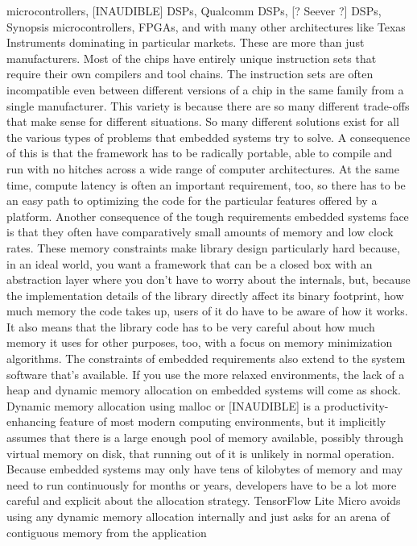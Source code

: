 microcontrollers, [INAUDIBLE] DSPs, Qualcomm DSPs, [? Seever ?] DSPs,
Synopsis microcontrollers, FPGAs, and with many other architectures
like Texas Instruments dominating in particular markets.
These are more than just manufacturers.
Most of the chips have entirely unique instruction sets
that require their own compilers and tool chains.
The instruction sets are often incompatible
even between different versions of a chip in the same family
from a single manufacturer.
This variety is because there are so many different trade-offs that
make sense for different situations.
So many different solutions exist for all the various types of problems
that embedded systems try to solve.
A consequence of this is that the framework
has to be radically portable, able to compile and run with no hitches
across a wide range of computer architectures.
At the same time, compute latency is often an important requirement, too,
so there has to be an easy path to optimizing
the code for the particular features offered by a platform.
Another consequence of the tough requirements embedded systems face
is that they often have comparatively small amounts of memory and low clock
rates.
These memory constraints make library design particularly hard
because, in an ideal world, you want a framework that
can be a closed box with an abstraction layer
where you don't have to worry about the internals,
but, because the implementation details of the library
directly affect its binary footprint, how much memory the code takes up,
users of it do have to be aware of how it works.
It also means that the library code has to be
very careful about how much memory it uses for other purposes,
too, with a focus on memory minimization algorithms.
The constraints of embedded requirements also
extend to the system software that's available.
If you use the more relaxed environments,
the lack of a heap and dynamic memory allocation on embedded systems
will come as shock.
Dynamic memory allocation using malloc or [INAUDIBLE]
is a productivity-enhancing feature of most modern computing environments,
but it implicitly assumes that there is a large enough pool of memory
available, possibly through virtual memory on disk, that running out of it
is unlikely in normal operation.
Because embedded systems may only have tens of kilobytes of memory
and may need to run continuously for months or years,
developers have to be a lot more careful and explicit about the allocation
strategy.
TensorFlow Lite Micro avoids using any dynamic memory allocation internally
and just asks for an arena of contiguous memory from the application

